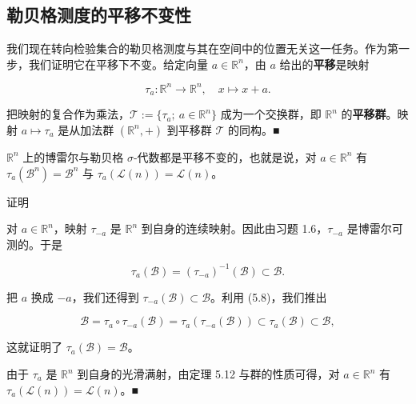 \subsection*{勒贝格测度的平移不变性}

我们现在转向检验集合的勒贝格测度与其在空间中的位置无关这一任务。作为第一步，我们证明它在平移下不变。给定向量 $ a \in \mathbb{R}^n $，由 $ a $ 给出的\textbf{平移}是映射

\begin{equation}
\tau_a: \mathbb{R}^n \to \mathbb{R}^n , \quad x \mapsto x + a .\tag{5.7}
\end{equation}

\begin{remark}

把映射的复合作为乘法，$ \mathcal{T} := \{ \tau_a ; \ a \in \mathbb{R}^n \} $ 成为一个交换群，即 $ \mathbb{R}^n $ 的\textbf{平移群}。映射 $ a \mapsto \tau_a $ 是从加法群 $ (\mathbb{R}^n, +) $ 到平移群 $ \mathcal{T} $ 的同构。\nobreak\hspace{0.35em}■

\end{remark}

\begin{lemma}

$ \mathbb{R}^n $ 上的博雷尔与勒贝格 $ \sigma $-代数都是平移不变的，也就是说，对 $ a \in \mathbb{R}^n $ 有 $ \tau_a(\mathcal{B}^n) = \mathcal{B}^n $ 与 $ \tau_a(\mathcal{L}(n)) = \mathcal{L}(n) $。

证明

\begin{subitems}
\item

对 $ a \in \mathbb{R}^n $，映射 $ \tau_{-a} $ 是 $ \mathbb{R}^n $ 到自身的连续映射。因此由习题 1.6，$ \tau_{-a} $ 是博雷尔可测的。于是

\begin{equation}
\tau_a(\mathcal{B}) = (\tau_{-a})^{-1}(\mathcal{B}) \subset \mathcal{B} .\tag{5.8}
\end{equation}

把 $ a $ 换成 $ -a $，我们还得到 $ \tau_{-a}(\mathcal{B}) \subset \mathcal{B} $。利用 (5.8)，我们推出

\begin{equation}
\mathcal{B} = \tau_a \circ \tau_{-a}(\mathcal{B}) = \tau_a(\tau_{-a}(\mathcal{B})) \subset \tau_a(\mathcal{B}) \subset \mathcal{B} ,\tag{5.9}
\end{equation}

这就证明了 $ \tau_a(\mathcal{B}) = \mathcal{B} $。

\item

由于 $ \tau_a $ 是 $ \mathbb{R}^n $ 到自身的光滑满射，由定理 5.12 与群的性质可得，对 $ a \in \mathbb{R}^n $ 有 $ \tau_a(\mathcal{L}(n)) = \mathcal{L}(n) $。\nobreak\hspace{0.35em}■

\end{subitems}

\end{lemma}

